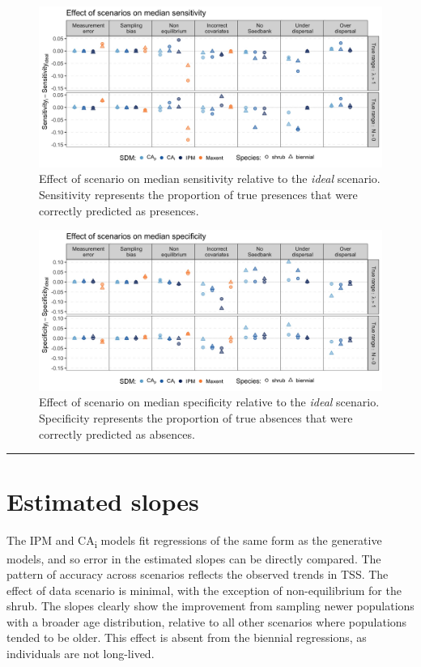 \documentclass[]{article}
\begin{document}
\begin{figure}
    \centering\includegraphics[width=.9\linewidth]{../../figs/Supp_SensvIdeal.jpg}
    \caption{\label{fig:SensitivityvIdeal} Effect of scenario on median sensitivity relative to the \emph{ideal} scenario. Sensitivity represents the proportion of true presences that were correctly predicted as presences.}
\end{figure}

\newpage
\begin{figure}
    \centering\includegraphics[width=.9\linewidth]{../../figs/Supp_SpecvIdeal.jpg}
    \caption{\label{fig:SpecificityvIdeal} Effect of scenario on median specificity relative to the \emph{ideal} scenario. Specificity represents the proportion of true absences that were correctly predicted as absences.}
\end{figure}

\begin{center}\rule{0.5\linewidth}{\linethickness}\end{center}

\newpage
\section{Estimated slopes}

The IPM and CA\textsubscript{i} models fit regressions of the same form
as the generative models, and so error in the estimated slopes can be
directly compared. The pattern of accuracy across scenarios reflects the
observed trends in TSS. The effect of data scenario is minimal, with the
exception of non-equilibrium for the shrub. The slopes clearly show the
improvement from sampling newer populations with a broader age
distribution, relative to all other scenarios where populations tended
to be older. This effect is absent from the biennial regressions, as
individuals are not long-lived.
\end{document}
